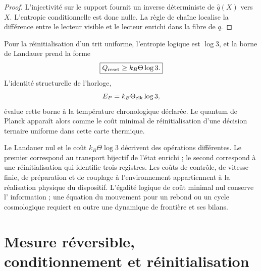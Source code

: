 \begin{proof}
L'injectivité sur le support fournit un inverse déterministe de
\(\widehat q(X)\) vers \(X\). L'entropie conditionnelle est donc nulle. La
règle de chaîne localise la différence entre le lecteur visible et le
lecteur enrichi dans la fibre de \(q\).
\end{proof}

Pour la réinitialisation d'un trit uniforme, l'entropie logique est \(\log3\),
et la borne de Landauer prend la forme
\begin{equation}
 \boxed{Q_{\rm reset}\geq k_B\Theta\log3.}
 \label{eq:rm-obs-trit-reset}
\end{equation}
L'identité structurelle de l'horloge,
\begin{equation}
 E_P=k_B\Theta_{\rm clk}\log3,
 \label{eq:rm-obs-planck-trit-landauer}
\end{equation}
évalue cette borne à la température chronologique déclarée. Le quantum de
Planck apparaît alors comme le coût minimal de réinitialisation d'une décision
ternaire uniforme dans cette carte thermique.

Le Landauer nul et le coût \(k_B\Theta\log3\) décrivent des opérations
différentes. Le premier correspond au transport bijectif de l'état
enrichi ; le second correspond à une réinitialisation qui identifie trois
registres. Les coûts de contrôle, de vitesse finie, de préparation et de
couplage à l'environnement appartiennent à la réalisation physique du
dispositif. L'égalité logique de coût minimal nul conserve l'
information ; une équation du mouvement pour un rebond ou un cycle
cosmologique requiert en outre une dynamique de frontière et ses bilans.

\section{Mesure réversible, conditionnement et réinitialisation}

